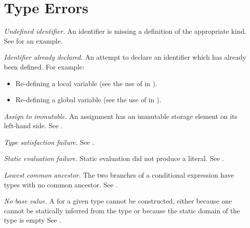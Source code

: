 \section{Type Errors\label{sec:TypingErrors}}
\begin{description}

\hypertarget{def-undefinedidentifier}{}
\item[$\UndefinedIdentifier$]
  \textit{Undefined identifier.}
  An identifier is missing a definition of the appropriate kind.
  See  for an example.

\hypertarget{def-identifieralreadydeclared}{}
\item[$\IdentifierAlreadyDeclared$]
  \textit{Identifier already declared.}
  An attempt to declare an identifier which has already been defined.
  For example:
  \begin{itemize}
    \item Re-defining a local variable (see the use of  in ).
    \item Re-defining a global variable (see the use of  in ).
  \end{itemize}

\hypertarget{def-aim}{}
\item[$\AssignmentToImmutable$]
  \textit{Assign to immutable.}
  An assignment has an immutable storage element on its left-hand side.
  See .

\hypertarget{def-typesatisfactionfailure}{}
\item[$\TypeSatisfactionFailure$]
  \textit{Type satisfaction failure.}
  See .

\hypertarget{def-staticevaluationfailure}{}
\item[$\StaticEvaluationFailure$]
  \textit{Static evaluation failure.}
  Static evaluation did not produce a literal.
  See .

\hypertarget{def-nolca}{}
\item[$\NoLCA$]
  \textit{Lowest common ancestor.}
  The two branches of a conditional expression have types with no common ancestor.
  See .

\hypertarget{def-nobasevalue}{}
\item[$\NoBaseValue$]
  \textit{No base value.}
  A \basevalueterm{} for a given type cannot be constructed, either because one cannot be statically inferred from the type or because the static domain of the type is empty
  See .


\end{description}
